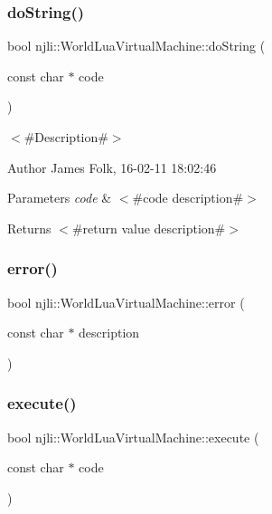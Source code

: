 \subsubsection{\texorpdfstring{do\+String()}{doString()}}
{\footnotesize\ttfamily bool njli\+::\+World\+Lua\+Virtual\+Machine\+::do\+String (\begin{DoxyParamCaption}\item[{const char $\ast$}]{code }\end{DoxyParamCaption})}



$<$\#\+Description\#$>$ 

\begin{DoxyAuthor}{Author}
James Folk, 16-\/02-\/11 18\+:02\+:46
\end{DoxyAuthor}

\begin{DoxyParams}{Parameters}
{\em code} & $<$\#code description\#$>$\\
\hline
\end{DoxyParams}
\begin{DoxyReturn}{Returns}
$<$\#return value description\#$>$ 
\end{DoxyReturn}
\mbox{\label{classnjli_1_1_world_lua_virtual_machine_aec9489519647fa9080f40a233ed03b70}} 
\subsubsection{\texorpdfstring{error()}{error()}}
{\footnotesize\ttfamily bool njli\+::\+World\+Lua\+Virtual\+Machine\+::error (\begin{DoxyParamCaption}\item[{const char $\ast$}]{description }\end{DoxyParamCaption})}

\mbox{\label{classnjli_1_1_world_lua_virtual_machine_a5d04b69a8ca98a5e77ec1a03abd6ece1}} 
\subsubsection{\texorpdfstring{execute()}{execute()}\hspace{0.1cm}{\footnotesize\ttfamily [1/33]}}
{\footnotesize\ttfamily bool njli\+::\+World\+Lua\+Virtual\+Machine\+::execute (\begin{DoxyParamCaption}\item[{const char $\ast$}]{code }\end{DoxyParamCaption})}



